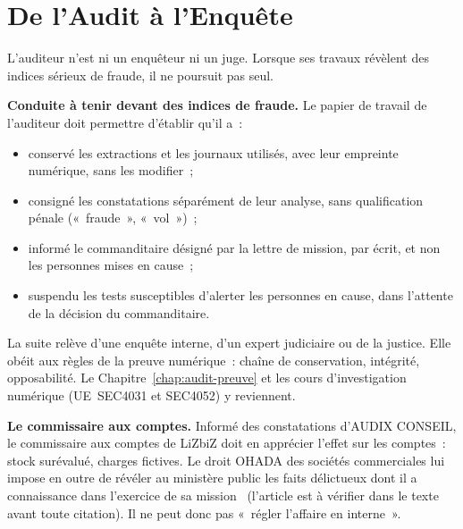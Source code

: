 \section{De l'Audit à l'Enquête}
\label{sec:c06-enquete}

L'auditeur n'est ni un enquêteur ni un juge. Lorsque ses travaux révèlent des
indices sérieux de fraude, il ne poursuit pas seul.

\begin{boxprocedure}
\textbf{Conduite à tenir devant des indices de fraude.} Le papier de travail
de l'auditeur doit permettre d'établir qu'il a~:
\begin{itemize}
    \item conservé les extractions et les journaux utilisés, avec leur
          empreinte numérique, sans les modifier~;
    \item consigné les constatations séparément de leur analyse, sans
          qualification pénale («~fraude~», «~vol~»)~;
    \item informé le commanditaire désigné par la lettre de mission, par
          écrit, et non les personnes mises en cause~;
    \item suspendu les tests susceptibles d'alerter les personnes en cause,
          dans l'attente de la décision du commanditaire.
\end{itemize}
\end{boxprocedure}

La suite relève d'une enquête interne, d'un expert judiciaire ou de la
justice. Elle obéit aux règles de la preuve numérique~: chaîne de
conservation, intégrité, opposabilité. Le Chapitre~\ref{chap:audit-preuve}
et les cours d'investigation numérique (UE~SEC4031 et SEC4052) y reviennent.

\begin{boxinfo}
\textbf{Le commissaire aux comptes.} Informé des constatations d'AUDIX
CONSEIL, le commissaire aux comptes de LiZbiZ doit en apprécier l'effet sur
les comptes~: stock surévalué, charges fictives. Le droit OHADA des
sociétés commerciales lui impose en outre de révéler au ministère public
les faits délictueux dont il a connaissance dans l'exercice de sa
mission~\cite{ohada2014auscgie} (l'article est à vérifier dans le texte
avant toute citation). Il ne peut donc pas «~régler l'affaire en interne~».
\end{boxinfo}


